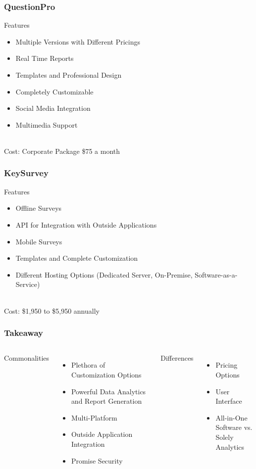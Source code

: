 \documentclass{beamer}
\begin{document}
	\begin{frame}
		\frametitle{QuestionPro}
		Features
		\begin{itemize}
			\item Multiple Versions with Different Pricings
			\item Real Time Reports
			\item Templates and Professional Design
			\item Completely Customizable
			\item Social Media Integration
			\item Multimedia Support
		\end{itemize}
		~\\
		Cost: Corporate Package \$75 a month
	\end{frame}
	
	\begin{frame}
		\frametitle{KeySurvey}
		Features
		\begin{itemize}
			\item Offline Surveys
			\item API for Integration with Outside Applications
			\item Mobile Surveys
			\item Templates and Complete Customization
			\item Different Hosting Options (Dedicated Server, On-Premise, Software-as-a-Service)
		\end{itemize}
		~\\
		Cost:  \$1,950 to \$5,950 annually
	\end{frame}

	\begin{frame}
		\frametitle{Takeaway}
		\begin{columns}[t]
			Commonalities
			\begin{itemize}
				\item Plethora of Customization Options
				\item Powerful Data Analytics and Report Generation
				\item Multi-Platform
				\item Outside Application Integration
				\item Promise Security
			\end{itemize}
			\pause
			Differences
			\begin{itemize}
				\item Pricing Options
				\item User Interface
				\item All-in-One Software vs.\\ Solely Analytics
			\end{itemize}
		\end{columns}
	\end{frame}
\end{document}
